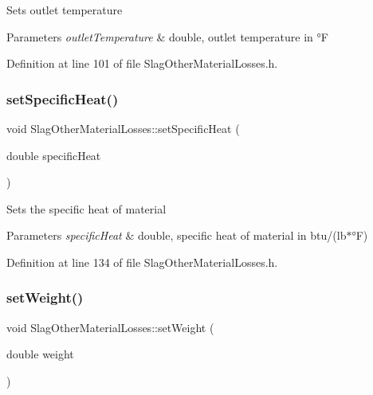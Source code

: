 Sets outlet temperature 
\begin{DoxyParams}{Parameters}
{\em outlet\+Temperature} & double, outlet temperature in °F \\
\hline
\end{DoxyParams}


Definition at line 101 of file Slag\+Other\+Material\+Losses.\+h.

\mbox{\label{class_slag_other_material_losses_a05488997f264a74afe3229250a286f92}} 
\subsubsection{\texorpdfstring{set\+Specific\+Heat()}{setSpecificHeat()}}
{\footnotesize\ttfamily void Slag\+Other\+Material\+Losses\+::set\+Specific\+Heat (\begin{DoxyParamCaption}\item[{double}]{specific\+Heat }\end{DoxyParamCaption})\hspace{0.3cm}{\ttfamily [inline]}}

Sets the specific heat of material 
\begin{DoxyParams}{Parameters}
{\em specific\+Heat} & double, specific heat of material in btu/(lb$\ast$°F) \\
\hline
\end{DoxyParams}


Definition at line 134 of file Slag\+Other\+Material\+Losses.\+h.

\mbox{\label{class_slag_other_material_losses_a230a178f2ead59cd498b620e4bb4910f}} 
\subsubsection{\texorpdfstring{set\+Weight()}{setWeight()}}
{\footnotesize\ttfamily void Slag\+Other\+Material\+Losses\+::set\+Weight (\begin{DoxyParamCaption}\item[{double}]{weight }\end{DoxyParamCaption})\hspace{0.3cm}{\ttfamily [inline]}}

